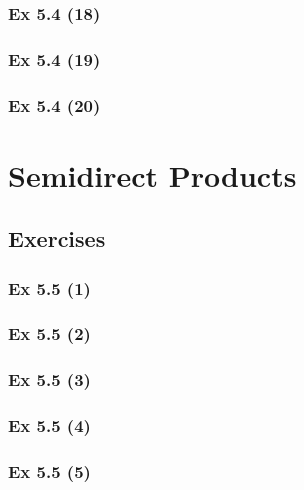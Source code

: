 \subsubsection{Ex 5.4 (18)}\label{sec:Ex_5.4.18}

\subsubsection{Ex 5.4 (19)}\label{sec:Ex_5.4.19}

\subsubsection{Ex 5.4 (20)}\label{sec:Ex_5.4.20}

\newpage		%

\section{Semidirect Products}\label{sec:5.5}	
\subsection*{Exercises}\label{sec:5.5_Exercises}

\subsubsection{Ex 5.5 (1)}\label{sec:Ex_5.5.1}

\subsubsection{Ex 5.5 (2)}\label{sec:Ex_5.5.2}

\subsubsection{Ex 5.5 (3)}\label{sec:Ex_5.5.3}

\subsubsection{Ex 5.5 (4)}\label{sec:Ex_5.5.4}

\subsubsection{Ex 5.5 (5)}\label{sec:Ex_5.5.5}


